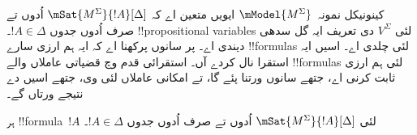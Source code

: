 \documentclass[../../../include/open-logic-section]{subfiles}
\begin{document}


کینونیکل نمونہ~$\mModel{M^\Sigma}$ ایویں متعین اے کہ
$\mSat{M^\Sigma}{!A}[\Delta]$ اُدوں تے صرف اُدوں جدوں $!A \in \Delta$۔ !!{propositional
variable}s لئی $V^\Sigma$ دی تعریف ایہ گل سدھی دیندی اے۔ پر سانوں پرکھنا اے کہ ایہ ہم ارزی سارے !!{formula}s لئی چلدی اے۔ اسیں ایہ استقرا نال کردے آں۔ استقرائی قدم وچ قضیاتی عاملاں والے !!{formula}s لئی ہم ارزی ثابت کرنی اے، جتھے سانوں  ورتنا پئے گا، تے امکانی عاملاں لئی وی، جتھے اسیں  دے نتیجے ورتاں گے۔

\begin{prop}
  ہر !!{formula}~$!A$ لئی $\mSat{M^\Sigma}{!A}[\Delta]$ اُدوں تے صرف اُدوں جدوں
  $!A \in \Delta$۔
\end{prop}
\end{document}
